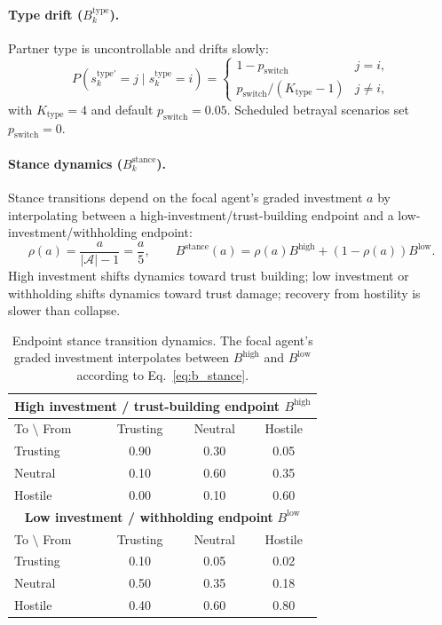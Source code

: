 \paragraph{Type drift ($B_k^{\mathrm{type}}$).}
Partner type is uncontrollable and drifts slowly:
\begin{equation}
P(s_k^{\mathrm{type}\prime}=j\mid s_k^{\mathrm{type}}=i)=
\begin{cases}
1-p_{\mathrm{switch}} & j=i,\\
p_{\mathrm{switch}}/(K_{\mathrm{type}}-1) & j\neq i,
\end{cases}
\label{eq:b_type}
\end{equation}
with $K_{\mathrm{type}}=4$ and default $p_{\mathrm{switch}}=0.05$. Scheduled betrayal scenarios set $p_{\mathrm{switch}}=0$.

\paragraph{Stance dynamics ($B_k^{\mathrm{stance}}$).}
Stance transitions depend on the focal agent's graded investment $a$ by interpolating between a high-investment/trust-building endpoint and a low-investment/withholding endpoint:
\begin{equation}
\rho(a)=\frac{a}{|\mathcal{A}|-1}=\frac{a}{5},
\qquad
B^{\mathrm{stance}}(a)=\rho(a)B^{\mathrm{high}}+(1-\rho(a))B^{\mathrm{low}}.
\label{eq:b_stance}
\end{equation}
High investment shifts dynamics toward trust building; low investment or withholding shifts dynamics toward trust damage; recovery from hostility is slower than collapse.

\begin{table}[H]
\centering
\caption{Endpoint stance transition dynamics. The focal agent's graded investment interpolates between $B^{\mathrm{high}}$ and $B^{\mathrm{low}}$ according to Eq.~\eqref{eq:b_stance}.}
\label{tab:stance_transition}
\begin{tabular}{lccc}
\toprule
\multicolumn{4}{c}{\textbf{High investment / trust-building endpoint }$B^{\mathrm{high}}$} \\
\midrule
To $\setminus$ From & Trusting & Neutral & Hostile \\
\midrule
Trusting & 0.90 & 0.30 & 0.05 \\
Neutral & 0.10 & 0.60 & 0.35 \\
Hostile & 0.00 & 0.10 & 0.60 \\
\midrule
\multicolumn{4}{c}{\textbf{Low investment / withholding endpoint }$B^{\mathrm{low}}$} \\
\midrule
To $\setminus$ From & Trusting & Neutral & Hostile \\
\midrule
Trusting & 0.10 & 0.05 & 0.02 \\
Neutral & 0.50 & 0.35 & 0.18 \\
Hostile & 0.40 & 0.60 & 0.80 \\
\bottomrule
\end{tabular}
\end{table}

